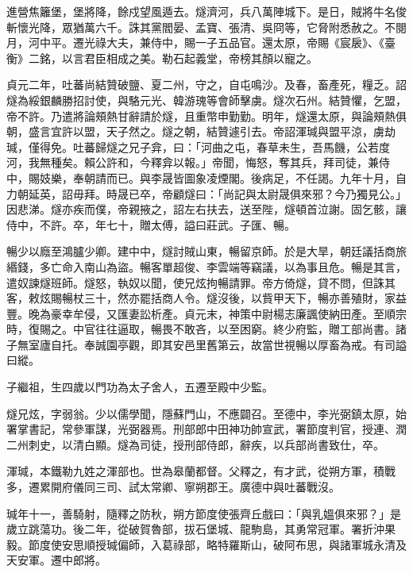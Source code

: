 \begin{pinyinscope}
 進營焦籬堡，堡將降，餘戍望風遁去。燧濟河，兵八萬陣城下。是日，賊將牛名俊斬懷光降，眾猶萬六千。誅其黨閻晏、孟寶、張清、吳冏等，它脅附悉赦之。不閱月，河中平。遷光祿大夫，兼侍中，賜一子五品官。還太原，帝賜《宸扆》、《臺衡》二銘，以言君臣相成之美。勒石起義堂，帝榜其顏以寵之。



 貞元二年，吐蕃尚結贊破鹽、夏二州，守之，自屯鳴沙。及春，畜產死，糧乏。詔燧為綏銀麟勝招討使，與駱元光、韓游瑰等會師擊虜。燧次石州。結贊懼，乞盟，帝不許。乃遣將論頰熱甘辭請於燧，且重幣申勤勤。明年，燧還太原，與論頰熱俱朝，盛言宜許以盟，天子然之。燧之朝，結贊遽引去。帝詔渾瑊與盟平涼，虜劫瑊，僅得免。吐蕃歸燧之兄子弇，曰：「河曲之屯，春草未生，吾馬饑，公若度河，我無種矣。賴公許和，今釋弇以報。」帝聞，悔怒，奪其兵，拜司徒，兼侍中，賜妓樂，奉朝請而已。與李晟皆圖象凌煙閣。後病足，不任謁。九年十月，自力朝延英，詔毋拜。時晟已卒，帝顧燧曰：「尚記與太尉晟俱來邪？今乃獨見公。」因悲涕。燧亦疾而僕，帝親掖之，詔左右扶去，送至陛，燧頓首泣謝。固乞骸，讓侍中，不許。卒，年七十，贈太傅，謚曰莊武。子匯、暢。



 暢少以廕至鴻臚少卿。建中中，燧討賊山東，暢留京師。於是大旱，朝廷議括商旅緡錢，多亡命入南山為盜。暢客單超俊、李雲端等竊議，以為事且危。暢是其言，遣奴諫燧班師。燧怒，執奴以聞，使兄炫拘暢請罪。帝方倚燧，貸不問，但誅其客，敕炫賜暢杖三十，然亦罷括商人令。燧沒後，以貲甲天下，暢亦善殖財，家益豐。晚為豪幸牟侵，又匯妻訟析產。貞元末，神策中尉楊志廉諷使納田產。至順宗時，復賜之。中官往往逼取，暢畏不敢吝，以至困窮。終少府監，贈工部尚書。諸子無室廬自托。奉誠園亭觀，即其安邑里舊第云，故當世視暢以厚畜為戒。有司謚曰縱。



 子繼祖，生四歲以門功為太子舍人，五遷至殿中少監。



 燧兄炫，字弱翁。少以儒學聞，隱蘇門山，不應闢召。至德中，李光弼鎮太原，始署掌書記，常參軍謀，光弼器焉。刑部郎中田神功帥宣武，署節度判官，授連、潤二州刺史，以清白顯。燧為司徒，授刑部侍郎，辭疾，以兵部尚書致仕，卒。



 渾瑊，本鐵勒九姓之渾部也。世為皋蘭都督。父釋之，有才武，從朔方軍，積戰多，遷累開府儀同三司、試太常卿、寧朔郡王。廣德中與吐蕃戰沒。



 瑊年十一，善騎射，隨釋之防秋，朔方節度使張齊丘戲曰：「與乳媼俱來邪？」是歲立跳蕩功。後二年，從破賀魯部，拔石堡城、龍駒島，其勇常冠軍。署折沖果毅。節度使安思順授瑊偏師，入葛祿部，略特羅斯山，破阿布思，與諸軍城永清及天安軍。遷中郎將。




\end{pinyinscope}
